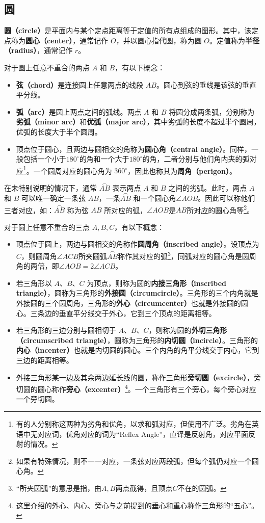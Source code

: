 \subsection{圆}\label{sub_HsGeBa_1}

\textbf{圆（circle）}是平面内与某个定点距离等于定值的所有点组成的图形。其中，该定点称为\textbf{圆心（center）}，通常记作 $O$，并以圆心指代圆，称为圆 $O$。定值称为\textbf{半径（radius）}，通常记作 $r$。

对于圆上任意不重合的两点 $A$ 和 $B$，有以下概念：
\begin{itemize}
\item \textbf{弦（chord）}是连接圆上任意两点的线段 $AB$。圆心到弦的垂线是该弦的垂直平分线。
\item \textbf{弧（arc）}是圆上两点之间的弧线。两点 $A$ 和 $B$ 将圆分成两条弧，分别称为\textbf{劣弧（minor arc）}和\textbf{优弧（major arc）}，其中劣弧的长度不超过半个圆周，优弧的长度大于半个圆周。
\item 顶点位于圆心，且两边与圆相交的角称为\textbf{圆心角（central angle）}。同样，一般包括一个小于$180^\circ$的角和一个大于$180^\circ$的角，二者分别与他们角内夹的弧对应\footnote{有的人分别称这两种为劣角和优角，以求和弧对应，但使用不广泛。劣角在英语中无对应词，优角对应的词为“Reflex Angle”，直译是反射角，对应平面反射的情况。}。一个圆周对应的圆心角为 $360^\circ$，因此也称其为\textbf{周角（perigon）}。
\end{itemize}

在未特别说明的情况下，通常 $\overset{\frown}{AB}$ 表示两点 $A$ 和 $B$ 之间的劣弧。此时，两点 $A$ 和 $B$ 可以唯一确定一条弦 $AB$，一条$\overset{\frown}{AB}$ 和一个圆心角$\angle AOB$。因此可以称他们三者对应，如：$\overset{\frown}{AB}$ 称为弦 $AB$ 所对应的弧，$\angle AOB$是$AB$所对应的圆心角等\footnote{如果有特殊情况，则不一一对应，一条弦对应两段弧，但每个弧仍对应一个圆心角。}。

对于圆上任意不重合的三点 $A,B,C$，有以下概念：
\begin{itemize}
\item 顶点位于圆上，两边与圆相交的角称作\textbf{圆周角（inscribed angle）}。设顶点为$C$，则圆周角$\angle ACB$所夹圆弧$\overset{\frown}{AB}$称作其对应的弧\footnote{“所夹圆弧”的意思是指，由$A,B$两点截得，且顶点$C$不在的圆弧。}，同弧对应的圆心角是圆周角的两倍，即$\angle AOB=2\angle ACB$。
\item 若三角形以 $A$、$B$、$C$ 为顶点，则称为圆的\textbf{内接三角形（inscribed triangle）}，圆称为三角形的\textbf{外接圆（circumcircle）}。三角形的三个内角就是外接圆的三个圆周角，三角形的\textbf{外心（circumcenter）}也就是外接圆的圆心。三条边的垂直平分线交于外心，它到三个顶点的距离相等。
\item 若三角形的三边分别与圆相切于 $A$、$B$、$C$，则称为圆的\textbf{外切三角形（circumscribed triangle）}，圆称为三角形的\textbf{内切圆（incircle）}。三角形的\textbf{内心（incenter）}也就是内切圆的圆心。三个内角的角平分线交于内心，它到三边的距离相等。
\item 外接三角形某一边及其余两边延长线的圆，称作三角形\textbf{旁切圆（excircle）}，旁切圆的圆心称作\textbf{旁心（excenter）}\footnote{这里介绍的外心、内心、旁心与之前提到的垂心和重心称作三角形的“五心”。}。一个三角形有三个旁心，每个旁心对应一个旁切圆。
\end{itemize}

